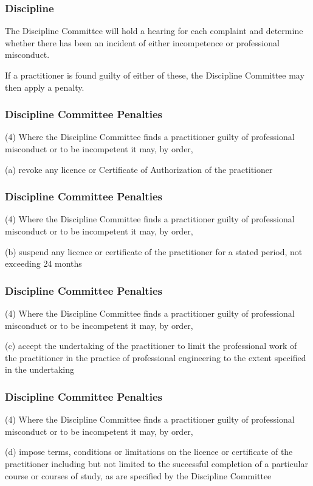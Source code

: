 \begin{frame}
\frametitle{Discipline}

The Discipline Committee will hold a hearing for each complaint and determine whether there has been an incident of either incompetence or professional misconduct.

If a practitioner is found guilty of either of these, the Discipline Committee may then apply a penalty.


\end{frame}



\begin{frame}
\frametitle{Discipline Committee Penalties}

(4) Where the Discipline Committee finds a practitioner guilty of professional misconduct or to be incompetent it may, by order,

(a) revoke any licence or Certificate of Authorization of the practitioner



\end{frame}

\begin{frame}
\frametitle{Discipline Committee Penalties}

(4) Where the Discipline Committee finds a practitioner guilty of professional misconduct or to be incompetent it may, by order,


(b) suspend any licence or certificate of the practitioner for a stated period, not exceeding 24 months


\end{frame}

\begin{frame}
\frametitle{Discipline Committee Penalties}

(4) Where the Discipline Committee finds a practitioner guilty of professional misconduct or to be incompetent it may, by order,


(c) accept the undertaking of the practitioner to limit the
		professional work of the practitioner in the practice
		of professional engineering to the extent specified in the
		undertaking


\end{frame}

\begin{frame}
\frametitle{Discipline Committee Penalties}

(4) Where the Discipline Committee finds a practitioner guilty of professional misconduct or to be incompetent it may, by order,


(d) impose terms, conditions or limitations on the licence or
 		certificate of the practitioner including but not limited to the
		successful completion of a particular course or courses of
		study, as are specified by the Discipline Committee


\end{frame}

